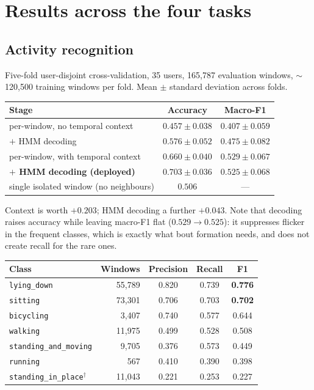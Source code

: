 \documentclass[11pt,a4paper]{article}
\newcommand{\code}[1]{\texttt{\small #1}}
\begin{document}
\section{Results across the four tasks}

\subsection{Activity recognition}

Five-fold user-disjoint cross-validation, 35 users, 165{,}787 evaluation windows,
$\sim$120{,}500 training windows per fold. Mean $\pm$ standard deviation across folds.

\begin{center}
\small
\begin{tabular}{@{}lcc@{}}
\toprule
Stage & Accuracy & Macro-F1 \\
\midrule
per-window, no temporal context        & $0.457 \pm 0.038$ & $0.407 \pm 0.059$ \\
\quad $+$ HMM decoding                 & $0.576 \pm 0.052$ & $0.475 \pm 0.082$ \\
per-window, with temporal context      & $0.660 \pm 0.040$ & $0.529 \pm 0.067$ \\
\textbf{$+$ HMM decoding (deployed)}   & $\mathbf{0.703 \pm 0.036}$ & $0.525 \pm 0.068$ \\
\midrule
single isolated window (no neighbours) & $0.506$ & --- \\
\bottomrule
\end{tabular}
\end{center}

Context is worth $+0.203$; HMM decoding a further $+0.043$. Note that decoding raises
accuracy while leaving macro-F1 flat ($0.529 \rightarrow 0.525$): it suppresses flicker
in the frequent classes, which is exactly what bout formation needs, and does not create
recall for the rare ones.

\begin{center}
\small
\begin{tabular}{@{}lrccc@{}}
\toprule
Class & Windows & Precision & Recall & F1 \\
\midrule
\code{lying\_down}          & 55{,}789 & 0.820 & 0.739 & \textbf{0.776} \\
\code{sitting}              & 73{,}301 & 0.706 & 0.703 & \textbf{0.702} \\
\code{bicycling}            &  3{,}407 & 0.740 & 0.577 & 0.644 \\
\code{walking}              & 11{,}975 & 0.499 & 0.528 & 0.508 \\
\code{standing\_and\_moving}&  9{,}705 & 0.376 & 0.573 & 0.449 \\
\code{running}              &     567 & 0.410 & 0.390 & 0.398 \\
\code{standing\_in\_place}$^{\dagger}$ & 11{,}043 & 0.221 & 0.253 & 0.227 \\
\bottomrule
\end{tabular}
\end{center}
\end{document}
